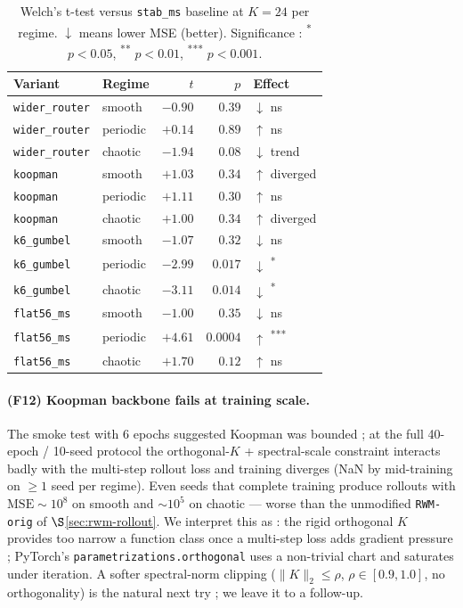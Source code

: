 \documentclass[11pt,a4paper]{article}
\begin{document}
\begin{table}[h]
\centering
\caption{Welch's t-test versus \texttt{stab\_ms} baseline at $K{=}24$
per regime. $\downarrow$ means lower MSE (better). Significance :
\textsuperscript{*} $p{<}0.05$, \textsuperscript{**} $p{<}0.01$,
\textsuperscript{***} $p{<}0.001$.}
\label{tab:sprint1-ttests}
\begin{tabular}{llrrl}
\toprule
Variant & Regime & $t$ & $p$ & Effect \\
\midrule
\texttt{wider\_router} & smooth   & $-0.90$ & $0.39$ & $\downarrow$ ns \\
\texttt{wider\_router} & periodic & $+0.14$ & $0.89$ & $\uparrow$ ns \\
\texttt{wider\_router} & chaotic  & $-1.94$ & $0.08$ & $\downarrow$ trend \\
\texttt{koopman}       & smooth   & $+1.03$ & $0.34$ & $\uparrow$ diverged \\
\texttt{koopman}       & periodic & $+1.11$ & $0.30$ & $\uparrow$ ns \\
\texttt{koopman}       & chaotic  & $+1.00$ & $0.34$ & $\uparrow$ diverged \\
\texttt{k6\_gumbel}    & smooth   & $-1.07$ & $0.32$ & $\downarrow$ ns \\
\texttt{k6\_gumbel}    & periodic & $-2.99$ & $\bm{0.017}$ & $\downarrow$ \textsuperscript{*} \\
\texttt{k6\_gumbel}    & chaotic  & $-3.11$ & $\bm{0.014}$ & $\downarrow$ \textsuperscript{*} \\
\texttt{flat56\_ms}    & smooth   & $-1.00$ & $0.35$ & $\downarrow$ ns \\
\texttt{flat56\_ms}    & periodic & $+4.61$ & $\bm{0.0004}$ & $\uparrow$ \textsuperscript{***} \\
\texttt{flat56\_ms}    & chaotic  & $+1.70$ & $0.12$ & $\uparrow$ ns \\
\bottomrule
\end{tabular}
\end{table}

\paragraph{(F12) Koopman backbone fails at training scale.}
The smoke test with 6 epochs suggested Koopman was bounded ; at the
full 40-epoch / 10-seed protocol the orthogonal-$K$ + spectral-scale
constraint interacts badly with the multi-step rollout loss and
training diverges (NaN by mid-training on $\geq 1$ seed per regime).
Even seeds that complete training produce rollouts with
$\mathrm{MSE} \sim 10^{8}$ on smooth and $\sim 10^{5}$ on chaotic ---
worse than the unmodified \texttt{RWM-orig} of
$\S$\ref{sec:rwm-rollout}. We interpret this as : the rigid orthogonal
$K$ provides too narrow a function class once a multi-step loss adds
gradient pressure ; PyTorch's
\texttt{parametrizations.orthogonal} uses a non-trivial chart and
saturates under iteration. A softer spectral-norm clipping
($\|K\|_2 \leq \rho$, $\rho \in [0.9, 1.0]$, no orthogonality) is the
natural next try ; we leave it to a follow-up.
\end{document}
